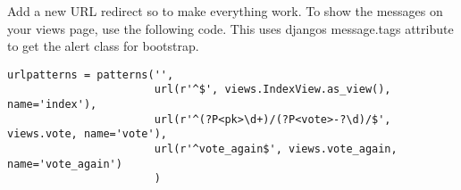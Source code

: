 Add a new URL redirect so to make everything work.
To show the messages on your views page, use the following code. This uses djangos message.tags attribute to get the alert class for bootstrap.
\begin{lstlisting}[style=Python, caption=urls.py, label=lst:urls.py1]
urlpatterns = patterns('',
                       url(r'^$', views.IndexView.as_view(), name='index'),
                       url(r'^(?P<pk>\d+)/(?P<vote>-?\d)/$', views.vote, name='vote'),
                       url(r'^vote_again$', views.vote_again, name='vote_again')
                       )
\end{lstlisting}